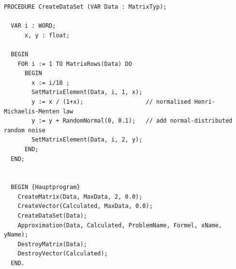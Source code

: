 \begin{refsection}
\begin{lstlisting}[caption=Test program]
  PROCEDURE CreateDataSet (VAR Data : MatrixTyp);

  VAR i : WORD;
      x, y : float;

  BEGIN
    FOR i := 1 TO MatrixRows(Data) DO
      BEGIN
        x := i/10 ;
        SetMatrixElement(Data, i, 1, x);
        y := x / (1+x);                  // normalised Henri-Michaelis-Menten law
        y := y + RandomNormal(0, 0.1);   // add normal-distributed random noise
        SetMatrixElement(Data, i, 2, y);
      END;
  END;


  BEGIN {Hauptprogram}
    CreateMatrix(Data, MaxData, 2, 0.0);
    CreateVector(Calculated, MaxData, 0.0);
    CreateDataSet(Data);
    Approximation(Data, Calculated, ProblemName, Formel, xName, yName);
    DestroyMatrix(Data);
    DestroyVector(Calculated);
  END.
\end{lstlisting}


\printbibliography[heading=subbibliography]
\end{refsection}
